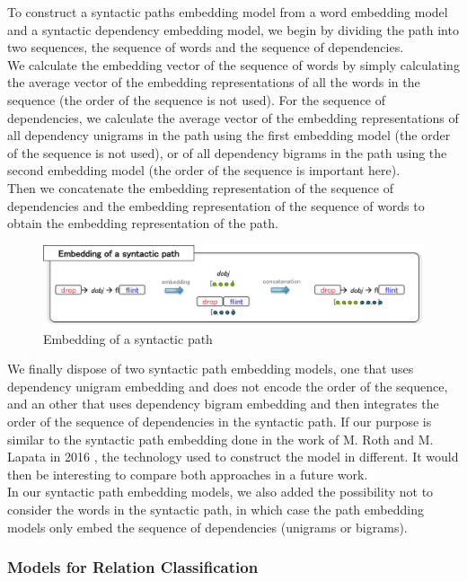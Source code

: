 \documentclass[12pt]{article}
\begin{document}
To construct a syntactic paths embedding model from a word embedding model and a syntactic dependency embedding model, we begin by dividing the path into two sequences, the sequence of words and the sequence of dependencies.\\
We calculate the embedding vector of the sequence of words by simply calculating the average vector of the embedding representations of all the words in the sequence (the order of the sequence is not used). For the sequence of dependencies, we calculate the average vector of the embedding representations of all dependency unigrams in the path using the first embedding model (the order of the sequence is not used), or of all dependency bigrams in the path using the second embedding model (the order of the sequence is important here).\\
Then we concatenate the embedding representation of the sequence of dependencies and the embedding representation of the sequence of words to obtain the embedding representation of the path.

\begin{figure}[!ht]
   \centering \includegraphics[width=\linewidth]{Figures/Semantic_Parsing/pathEmbedding.png}
   \caption{\label{pathEmbedding} Embedding of a syntactic path}
\end{figure}

We finally dispose of two syntactic path embedding models, one that uses dependency unigram embedding and does not encode the order of the sequence, and an other that uses dependency bigram embedding and then integrates the order of the sequence of dependencies in the syntactic path. If our purpose is similar to the syntactic path embedding done in the work of M. Roth and M. Lapata in 2016 \cite{roth2016neural}, the technology used to construct the model in different. It would then be interesting to compare both approaches in a future work.\\
In our syntactic path embedding models, we also added the possibility not to consider the words in the syntactic path, in which case the path embedding models only embed the sequence of dependencies (unigrams or bigrams).

\subsubsection{Models for Relation Classification}
\end{document}
